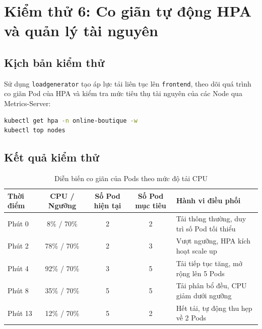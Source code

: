 \section{Kiểm thử 6: Co giãn tự động HPA và quản lý tài nguyên}
\subsection{Kịch bản kiểm thử}
Sử dụng \texttt{loadgenerator} tạo áp lực tải liên tục lên \texttt{frontend}, theo dõi quá trình co giãn Pod của HPA và kiểm tra mức tiêu thụ tài nguyên của các Node qua Metrics-Server:
\begin{lstlisting}[language=bash]
kubectl get hpa -n online-boutique -w
kubectl top nodes
\end{lstlisting}

\subsection{Kết quả kiểm thử}
\begin{table}[H]
    \centering
    \small
    \renewcommand{\arraystretch}{1.25}
    \caption{Diễn biến co giãn của Pods theo mức độ tải CPU}
    \label{tab:hpa_test}
    \begin{tabularx}{\textwidth}{l c c c X}
        \toprule
        \textbf{Thời điểm} & \textbf{CPU / Ngưỡng} & \textbf{Số Pod hiện tại} & \textbf{Số Pod mục tiêu} & \textbf{Hành vi điều phối} \\
        \midrule
        Phút 0 & 8\% / 70\% & 2 & 2 & Tải thông thường, duy trì số Pod tối thiểu \\
        Phút 2 & 78\% / 70\% & 2 & 3 & Vượt ngưỡng, HPA kích hoạt scale up \\
        Phút 4 & 92\% / 70\% & 3 & 5 & Tải tiếp tục tăng, mở rộng lên 5 Pods \\
        Phút 8 & 35\% / 70\% & 5 & 5 & Tải phân bổ đều, CPU giảm dưới ngưỡng \\
        Phút 13 & 12\% / 70\% & 5 & 2 & Hết tải, tự động thu hẹp về 2 Pods \\
        \bottomrule
    \end{tabularx}
\end{table}

